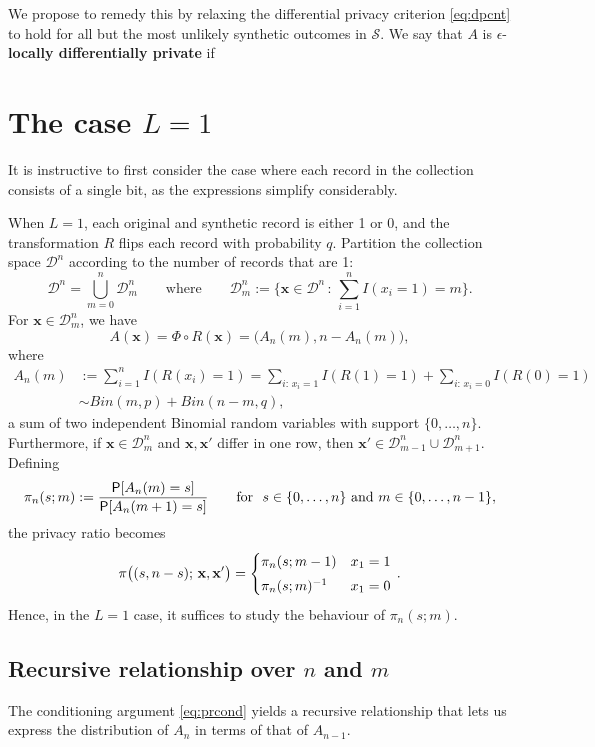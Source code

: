 \documentclass[11pt,draft]{article}
\newcommand{\Dsp}{\mathcal{D}}
\newcommand{\Ssp}{\mathcal{S}}
\newcommand{\xv}{\mathbf{x}}
\begin{document}
We propose to remedy this by relaxing the differential privacy criterion 
\eqref{eq:dpcnt} to hold for all but the most unlikely synthetic outcomes
in $\Ssp$.
We say that $A$ is $\epsilon$-\textbf{locally differentially private} if


\section{The case $L = 1$}

It is instructive to first consider the case where each record in the collection consists of a single bit, as the expressions simplify considerably.

When $L=1$, each original and synthetic record is either 1 or 0, and the transformation $R$ flips each record with probability $q$.
Partition the collection space $\Dsp^n$ according to the number of records that are 1:
\[ \Dsp^n = \bigcup_{m = 0}^n \Dsp_m^n
\quad\quad\text{where}\quad\quad
\Dsp_m^n := \bigg\{ \xv\in\Dsp^n \,:\, \sum_{i=1}^n I(x_i = 1) = m \bigg\}.
\]
For $\xv\in\Dsp_m^n$, we have
\[ A(\xv) = \Phi\circ R(\xv) = \big(A_n(m), n - A_n(m)\big), \]
where
\begin{align*}
A_n(m) &:= \sum_{i=1}^n I(R(x_i) = 1)
= \sum_{i:\, x_i = 1} I(R(1) = 1) + \sum_{i:\, x_i = 0} I(R(0) = 1) \\
&\sim Bin(m, p) + Bin(n-m, q),
\end{align*}
a sum of two independent Binomial random variables with support $\{0,\dots,n\}$.
Furthermore, if $\xv\in\Dsp_m^n$ and $\xv,\xv'$ differ in one row, then $\xv'\in\Dsp_{m-1}^n \cup \Dsp_{m+1}^n$.
Defining
\[ \pi_n(s; m) := \frac{\P[A_n(m) = s]}{\P[A_n(m+1) = s]}
\quad\quad\text{for}\ \ 
s\in\{0,\dots,n\}\ \text{and}\ m\in\{0,\dots,n-1\},
\]
the privacy ratio becomes
\[ \pi\big((s, n-s);\,\xv,\xv'\big) =
\begin{cases}
\pi_n(s;m - 1) & x_1 = 1 \\[0.3em]
\inv{\pi_n(s;m)} & x_1 = 0
\end{cases}\, .
\]
Hence, in the $L=1$ case, it suffices to study the behaviour of $\pi_n(s;m)$.


\subsection{Recursive relationship over $n$ and $m$}

The conditioning argument \eqref{eq:prcond} yields a recursive relationship that lets us express the distribution of $A_n$ in terms of that of $A_{n-1}$.
\end{document}
